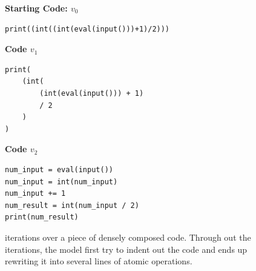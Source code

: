 \begin{figure}[t!]
\textbf{Starting Code: $v_0$} 
\begin{verbatim}
print((int((int(eval(input()))+1)/2)))
\end{verbatim}

\textbf{Code $v_1$}
\begin{verbatim}
print(
    (int(
        (int(eval(input())) + 1)
        / 2
    )
)
\end{verbatim}

    
\textbf{Code $v_2$}
\begin{verbatim}
num_input = eval(input())
num_input = int(num_input)
num_input += 1
num_result = int(num_input / 2)
print(num_result)
\end{verbatim}

\caption{\ours iterations over a piece of densely composed code. Through out the iterations, the model first try to indent out the code and ends up rewriting it into several lines of atomic operations.
}
\label{fig:code:code-iterations}
\end{figure}